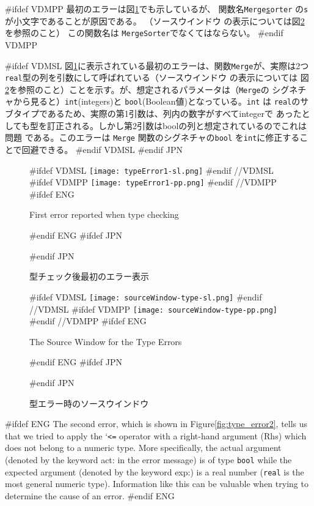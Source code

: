 \documentclass[\pformat,12pt]{article}
\newcommand{\Lit}[1]{`#1\Quote}
\newcommand{\Sig}[1]{\Lit{{\tt #1}}}
\newcommand{\guicmd}[1]{{\sf #1}}
\newcommand{\guicmd}[1]{{\gt #1}}
\begin{document}
#ifdef VDMPP
最初のエラーは図\ref{fig:type_error1}でも示しているが、
関数名{\tt Merge\underline{s}orter} の{\tt s}が小文字であることが原因である。
（\guicmd{ソースウインドウ} の表示については図\ref{fig:source-type}を参照のこと）
この関数名は {\tt MergeSorter}でなくてはならない。
#endif VDMPP

#ifdef VDMSL 
図\ref{fig:type_error1}に表示されている最初のエラーは、関数{\tt Merge}が、実際は2つ
{\tt real}型の列を引数にして呼ばれている（\guicmd{ソースウインドウ} の表示については
図\ref{fig:source-type}を参照のこと）ことを示す。が、想定されるパラメータは（{\tt Merge}の
シグネチャから見ると）{\tt int}(integers)と {\tt bool}(Boolean値)となっている。{\tt int} は
{\tt real}のサブタイプであるため、実際の第1引数は、列内の数字がすべてintegerで
あったとしても型を訂正される。しかし第2引数はboolの列と想定されているのでこれは問題
である。このエラーは {\tt Merge} 関数のシグネチャの{\tt bool} を{\tt int}に修正することで回避できる。
#endif VDMSL
#endif JPN

\begin{figure}[tbh]
\begin{center}
#ifdef VDMSL
\texttt{[image: typeError1-sl.png]}
#endif //VDMSL
#ifdef VDMPP
\texttt{[image: typeError1-pp.png]}
#endif //VDMPP
#ifdef ENG
\caption{First error reported when type checking}
#endif ENG
#ifdef JPN
\caption{型チェック後最初のエラー表示}
#endif JPN
\label{fig:type_error1}
\end{center}
\end{figure}

\begin{figure}[tbh]
\begin{center}
#ifdef VDMSL
\texttt{[image: sourceWindow-type-sl.png]}
#endif //VDMSL
#ifdef VDMPP
\texttt{[image: sourceWindow-type-pp.png]}
#endif //VDMPP
#ifdef ENG
\caption{The Source Window for the Type Errors}
#endif ENG
#ifdef JPN
\caption{型エラー時のソースウインドウ}
#endif JPN
\label{fig:source-type}
\end{center}
\end{figure}

#ifdef ENG
The second error, which is shown in Figure\ref{fig:type_error2},
tells us that we tried to apply the \Sig{<=} operator with a
right-hand argument (Rhs) which does not belong to a numeric
type. More specifically, the actual argument (denoted by the keyword
{\sf act:} in the error message) is of type {\tt bool} while the 
expected argument (denoted by the keyword {\sf exp:}) is a real number
({\tt real} is the most general numeric type). Information like this
can be valuable when trying to determine the cause of an error.
#endif ENG
\end{document}
